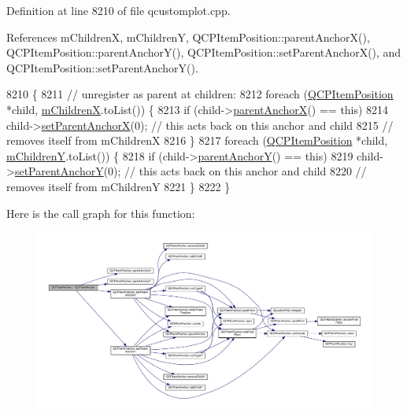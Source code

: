 Definition at line 8210 of file qcustomplot.\+cpp.



References m\+Children\+X, m\+Children\+Y, Q\+C\+P\+Item\+Position\+::parent\+Anchor\+X(), Q\+C\+P\+Item\+Position\+::parent\+Anchor\+Y(), Q\+C\+P\+Item\+Position\+::set\+Parent\+Anchor\+X(), and Q\+C\+P\+Item\+Position\+::set\+Parent\+Anchor\+Y().


\begin{DoxyCode}
8210                               \{
8211   \textcolor{comment}{// unregister as parent at children:}
8212   \textcolor{keywordflow}{foreach} (\hyperlink{class_q_c_p_item_position}{QCPItemPosition} *child, \hyperlink{class_q_c_p_item_anchor_ab8fd931923357898286ae604e1380fa7}{mChildrenX}.toList()) \{
8213     \textcolor{keywordflow}{if} (child->\hyperlink{class_q_c_p_item_position_a485abba71c8552086c5f68e95dca7f9a}{parentAnchorX}() == \textcolor{keyword}{this})
8214       child->\hyperlink{class_q_c_p_item_position_add71461a973927c74e42179480916d9c}{setParentAnchorX}(0); \textcolor{comment}{// this acts back on this anchor and child}
8215                                   \textcolor{comment}{// removes itself from mChildrenX}
8216   \}
8217   \textcolor{keywordflow}{foreach} (\hyperlink{class_q_c_p_item_position}{QCPItemPosition} *child, \hyperlink{class_q_c_p_item_anchor_a6d58eb782eda4d96a95067354305b139}{mChildrenY}.toList()) \{
8218     \textcolor{keywordflow}{if} (child->\hyperlink{class_q_c_p_item_position_a1502dba801cb20424b7e097399e372de}{parentAnchorY}() == \textcolor{keyword}{this})
8219       child->\hyperlink{class_q_c_p_item_position_add5ec1db9d19cec58a3b5c9e0a0c3f9d}{setParentAnchorY}(0); \textcolor{comment}{// this acts back on this anchor and child}
8220                                   \textcolor{comment}{// removes itself from mChildrenY}
8221   \}
8222 \}
\end{DoxyCode}


Here is the call graph for this function\+:\nopagebreak
\begin{figure}[H]
\begin{center}
\leavevmode
\includegraphics[width=350pt]{class_q_c_p_item_anchor_a1868559407600688ee4d1a4621e81ceb_cgraph}
\end{center}
\end{figure}




